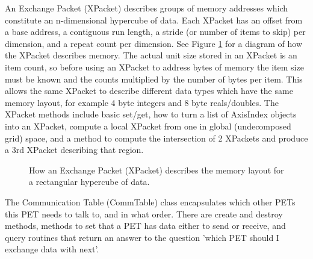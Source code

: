 \begin{enumerate}
An Exchange Packet (XPacket) describes groups of memory addresses
which constitute an n-dimensional hypercube of data.
Each XPacket has an offset from a base address, 
a contiguous run length, 
a stride (or number of items to skip) per dimension,
and a repeat count per dimension. 
See Figure \ref{fig:xpacketbasic} for a diagram of how the XPacket
describes memory.
The actual unit size stored in an XPacket is an item count, 
so before using an XPacket to address bytes of memory
the item size must be known and the
counts multiplied by the number of bytes per item.  This allows
the same XPacket to describe different data types which have the
same memory layout, for example 4 byte integers and 8 byte reals/doubles.
The XPacket methods include basic set/get, how to turn
a list of AxisIndex objects into an XPacket, compute a local XPacket from one
in global (undecomposed grid) space, and a method to compute the intersection
of 2 XPackets and produce a 3rd XPacket describing that region.  

\begin{center}
\begin{figure}
\caption{How an Exchange Packet (XPacket) describes the memory
layout for a rectangular hypercube of data.}
\label{fig:xpacketbasic}
\end{figure}
\end{center}

The Communication Table (CommTable) class encapsulates which other PETs this
PET needs to talk to, and in what order.  There are create and destroy
methods, methods to set that a PET has data either to
send or receive, and query routines that return an answer
to the question 'which PET should I exchange data with next'.  


\end{enumerate}
